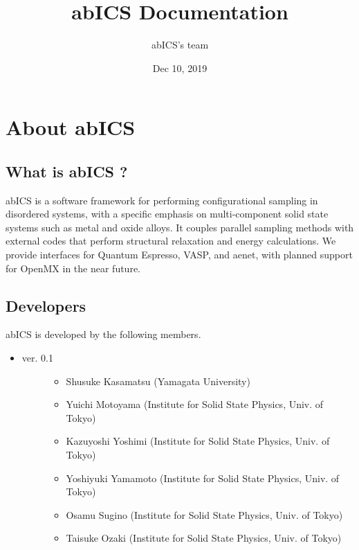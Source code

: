\documentclass[letterpaper,10pt,english]{sphinxmanual}
\title{abICS Documentation}
\date{Dec 10, 2019}
\author{abICS's team}
\begin{document}
\maketitle
\sphinxtableofcontents
{}\label{\detokenize{index::doc}}



\chapter{About abICS}
\label{\detokenize{about/index::doc}}\label{\detokenize{about/index:welcome-to-abics-s-documentation}}\label{\detokenize{about/index:about-abics}}

\section{What is abICS ?}
\label{\detokenize{about/info:what-is-abics}}\label{\detokenize{about/info::doc}}
abICS is a software framework for performing configurational sampling in disordered systems, with a specific emphasis on multi-component solid state systems such as metal and oxide alloys. It couples parallel sampling methods with external codes that perform structural relaxation and energy calculations. We provide interfaces for Quantum Espresso, VASP, and aenet, with planned support for OpenMX in the near future.


\section{Developers}
\label{\detokenize{about/info:developers}}
abICS is developed by the following members.
\begin{itemize}
\item {} \begin{description}
\item[{ver. 0.1}] \leavevmode\begin{itemize}
\item {} 
Shusuke Kasamatsu (Yamagata University)

\item {} 
Yuichi Motoyama (Institute for Solid State Physics, Univ. of Tokyo)

\item {} 
Kazuyoshi Yoshimi (Institute for Solid State Physics, Univ. of Tokyo)

\item {} 
Yoshiyuki Yamamoto (Institute for Solid State Physics, Univ. of Tokyo)

\item {} 
Osamu Sugino (Institute for Solid State Physics, Univ. of Tokyo)

\item {} 
Taisuke Ozaki (Institute for Solid State Physics, Univ. of Tokyo)

\end{itemize}

\end{description}

\end{itemize}
\end{document}
